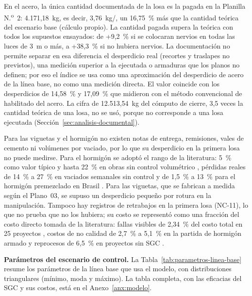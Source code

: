 En el acero, la única cantidad documentada de la losa es la pagada en la Planilla N.\textsuperscript{o}~2: 4.171,18~kg, es decir, 3,76~kg/\mdos{}, un 16,75~\% más que la cantidad teórica del escenario base (cálculo propio). La cantidad pagada supera la teórica con todos los supuestos ensayados: de +9,2~\% si se colocaran nervios en todas las luces de 3~m o más, a +38,3~\% si no hubiera nervios. La documentación no permite separar en esa diferencia el desperdicio real (recortes y traslapes no previstos), una medición superior a la ejecutada o armaduras que los planos no definen; por eso el índice se usa como una aproximación del desperdicio de acero de la línea base, no como una medición directa. El valor coincide con los desperdicios de 14,58~\% y 17,09~\% que \textcite[pp.~147, 169]{chino2024} midieron con el método convencional de habilitado del acero. La cifra de 12.513,54~kg del cómputo de cierre, 3,5 veces la cantidad teórica de una losa, no se usó, porque no corresponde a una losa ejecutada (Sección~\ref{sec:analisis-documental}).

Para las viguetas y el hormigón no existen notas de entrega, remisiones, vales de cemento ni volúmenes por vaciado, por lo que su desperdicio en la primera losa no puede medirse. Para el hormigón se adoptó el rango de la literatura: 5~\% como valor típico y hasta 22~\% en obras sin control volumétrico \parencite[pp.~53, 73]{galarza2011}, pérdidas reales de 14~\% a 27~\% en vaciados semanales sin control \parencite[pp.~33, 40]{rojas2018} y de 1,5~\% a 13~\% para el hormigón premezclado en Brasil \parencite[p.~106]{maciel2016}. Para las viguetas, que se fabrican a medida según el Plano~03, se supuso un desperdicio pequeño por rotura en la manipulación. Tampoco hay registros de retrabajos en la primera losa (NC-11), lo que no prueba que no los hubiera; su costo se representó como una fracción del costo directo tomada de la literatura: fallas visibles de 2,34~\% del costo total en 25 proyectos \parencite[p.~5421]{khadim2023}, costos de no calidad de 2,7~\% a 5,1~\% en la partida de hormigón armado \parencite[p.~1]{gudiel2020} y reprocesos de 6,5~\% en proyectos sin SGC \parencite[p.~12]{alvarez2014}.

\textbf{Parámetros del escenario de control.} La Tabla~\ref{tab:parametros-linea-base} resume los parámetros de la línea base que usa el modelo, con distribuciones triangulares (mínimo, moda y máximo). La tabla completa, con las eficacias del SGC y sus costos, está en el Anexo~\ref{anx:modelo}.

